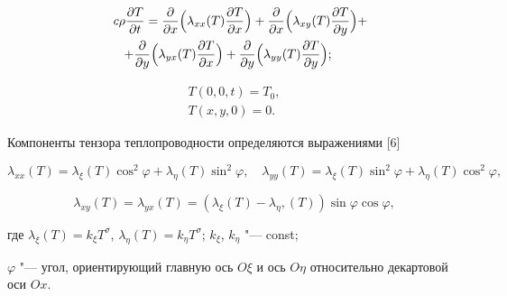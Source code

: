 \begin{multline}

\label{formaL:eq1} \quad

c\rho \frac{\partial T}{\partial t}=

\frac{\partial }{\partial x}\Bigl(\lambda _{xx} (T)\frac{\partial 

T}{\partial x}\Bigr)+

\frac{\partial }{\partial x}\Bigl(\lambda _{xy} (T)\frac{\partial 

T}{\partial y}\Bigr)+ \\+

\frac{\partial }{\partial y}\Bigl(\lambda _{yx} (T)\frac{\partial 

T}{\partial x}\Bigr)+

\frac{\partial }{\partial y}\Bigl(\lambda _{yy} (T)\frac{\partial 

T}{\partial y}\Bigr); \quad

\end{multline}

\begin{gather}

\label{formaL:eq2}

T(0, 0, t)=T_0 ,

\\

\label{formaL:eq3}

T(x, y, 0)=0.

\end{gather}

Компоненты тензора теплопроводности определяются выражениями [6]

\[

\lambda _{xx} (T)=\lambda _\xi (T)\cos ^2\varphi +\lambda _\eta (T)\sin 

^2\varphi ,

\quad

\lambda _{yy} (T)=\lambda _\xi (T)\sin ^2\varphi +\lambda _\eta (T)\cos 

^2\varphi ,

\]

\[

\lambda _{xy} (T)=\lambda _{yx} (T)=(\lambda _\xi (T)-\lambda _\eta ,

(T))\sin \varphi \cos \varphi ,

\]

где $\lambda _\xi(T) = k_\xi T^\sigma$, $\lambda _\eta (T)= k_\eta T^\sigma$; $k_\xi$, $k_\eta$ "--- const; 

$\varphi $ "--- угол, ориентирующий главную ось $O\xi $ и ось $O\eta $ относительно декартовой оси $Ox$. 



